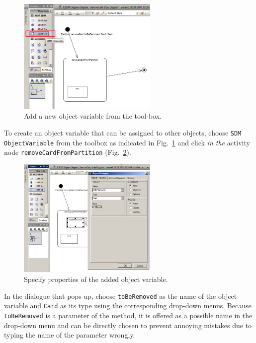 \begin{figure}[htp]
\begin{center}
  \includegraphics[width=0.6\textwidth]{pics/sdmBilder/removeCard/sdm09RAW}
  \caption{Add a new object variable from the tool-box.}  
  \label{fig:tool_box}
\end{center}
\end{figure}

To create an object variable that can be assigned to other objects, choose
\texttt{SDM ObjectVariable} from the toolbox as indicated in
Fig.~\ref{fig:tool_box} and click \emph{in the} activity node \texttt{removeCardFromPartition} (Fig.~\ref{fig:object_variable_properties}). 

\begin{figure}[htp]
\begin{center}
  \includegraphics[width=0.6\textwidth]{pics/sdmBilder/removeCard/sdm10RAW}
  \caption{Specify properties of the added object variable.}  
  \label{fig:object_variable_properties}
\end{center}
\end{figure}

In the dialogue that pops up, choose \texttt{toBeRemoved} as the name of the
object variable and \texttt{Card} as its type using the corresponding drop-down
menus.  Because \texttt{toBeRemoved} is a parameter of the method, it is offered
as a possible name in the drop-down menu and can be directly chosen to prevent
annoying mistakes due to typing the name of the parameter wrongly.

